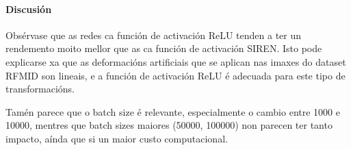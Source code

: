 



\FloatBarrier

\paragraph{Discusión}
\label{par:Discusion-batchsize}

Obsérvase que as redes ca función de activación ReLU tenden a ter un rendemento moito mellor que as ca función de activación SIREN. Isto pode explicarse xa que as deformacións artificiais que se aplican nas imaxes do dataset RFMID son lineais, e a función de activación ReLU é adecuada para este tipo de transformacións.

Tamén parece que o batch size é relevante, especialmente o cambio entre 1000 e 10000, mentres que batch sizes maiores (50000, 100000) non parecen ter tanto impacto, aínda que si un maior custo computacional. 

